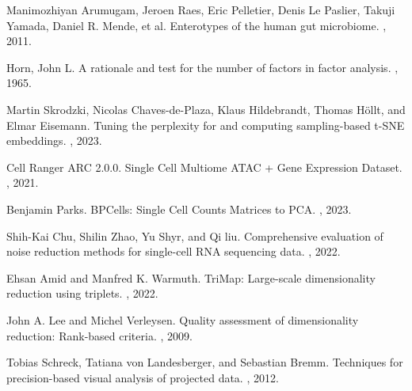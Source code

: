 \documentclass{article}
\begin{document}
\begin{thebibliography}{10}
Manimozhiyan Arumugam, Jeroen Raes, Eric Pelletier, Denis Le Paslier, Takuji Yamada, Daniel R. Mende, et al.
\newblock Enterotypes of the human gut microbiome.
, 2011.

Horn, John L.
\newblock A rationale and test for the number of factors in factor analysis.
, 1965.

Martin Skrodzki, Nicolas Chaves-de-Plaza, Klaus Hildebrandt, Thomas H\"ollt, and Elmar Eisemann.
\newblock Tuning the perplexity for and computing sampling-based t-SNE embeddings.
, 2023.

Cell Ranger ARC 2.0.0.
\newblock Single Cell Multiome ATAC + Gene Expression Dataset.
, 2021.

Benjamin Parks.
\newblock BPCells: Single Cell Counts Matrices to PCA.
, 2023.

Shih-Kai Chu, Shilin Zhao, Yu Shyr, and Qi liu.
\newblock Comprehensive evaluation of noise reduction methods for single-cell RNA sequencing data.
, 2022.

Ehsan Amid and Manfred K. Warmuth. 
\newblock TriMap: Large-scale dimensionality reduction using triplets. 
, 2022.

John A. Lee and Michel Verleysen.
\newblock Quality assessment of dimensionality reduction: Rank-based criteria.
, 2009.

Tobias Schreck, Tatiana von Landesberger, and Sebastian Bremm.
\newblock Techniques for precision-based visual analysis of projected data.
, 2012.

\end{thebibliography}
\end{document}
